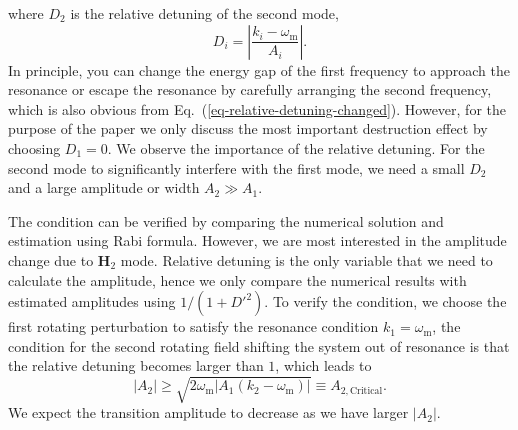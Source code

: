 \documentclass[%
reprint,
 amsmath,amssymb,
 prd,
]{revtex4-1}
\newcommand{\RD}{D}
\begin{document}
where $\RD_2$ is the relative detuning of the second mode,
\begin{equation*}
\RD_i =  \left\lvert \frac{ k_i - \omega_{\mathrm m}}{A_i} \right \rvert.
\end{equation*}
In principle, you can change the energy gap of the first frequency to approach the resonance or escape the resonance by carefully arranging the second frequency, which is also obvious from Eq.~(\ref{eq-relative-detuning-changed}). However, for the purpose of the paper we only discuss the most important destruction effect by choosing $\RD_1 = 0$. We observe the importance of the relative detuning. For the second mode to significantly interfere with the first mode, we need a small $\RD_2$ and a large amplitude or width $A_2\gg A_1$.

The condition can be verified by comparing the numerical solution and estimation using Rabi formula. However, we are most interested in the amplitude change due to $\mathbf H_2$ mode. Relative detuning is the only variable that we need to calculate the amplitude, hence we only compare the numerical results with estimated amplitudes using $1/(1+\RD'^2)$.
To verify the condition, we choose the first rotating perturbation to satisfy the resonance condition $k_1=\omega_{\mathrm{m}}$, the condition for the second rotating field shifting the system out of resonance is that the relative detuning becomes larger than $1$, which leads to
\begin{equation}
\lvert A_2 \rvert \geq \sqrt{2\omega_{\mathrm{m}} \lvert A_1 (k_2-\omega_{\mathrm m})\rvert} \equiv A_{2,\mathrm{Critical}}.
\end{equation}
We expect the transition amplitude to decrease as we have larger $\lvert A_2\rvert$.
\end{document}
